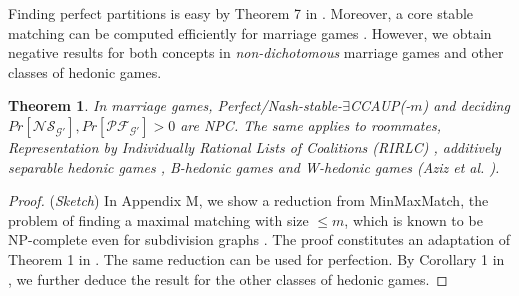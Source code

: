 \documentclass[letterpaper]{article} %
\newtheorem{theorem}{Theorem}
\begin{document}
Finding perfect partitions is easy by Theorem 7 in \cite{aziz2013pareto}. Moreover, a core stable matching can be computed efficiently for marriage games \cite{gale1962college}. However, we obtain negative results for both concepts in \textit{non-dichotomous} marriage games and other classes of hedonic games.
\begin{theorem}
\label{theorem:nash-stable-marriage}
In marriage games, Perfect/Nash-stable-$\exists$CCAUP(-$m$) and deciding $Pr[\mathcal{NS}_{\mathcal{G}'}], Pr[\mathcal{PF}_{\mathcal{G}'}] > 0$ are NPC. The same applies to {\normalfont roommates}, {\normalfont Representation by Individually Rational Lists of Coalitions (RIRLC)} \cite{ballester2004np}, {\normalfont additively separable hedonic games} \cite{olsen2009nash}, {\normalfont B-hedonic games} and {\normalfont W-hedonic games} (Aziz et al. ).
\end{theorem}
\begin{proof}
(\textit{Sketch}) In Appendix M, we show a reduction from MinMaxMatch, the problem of finding a maximal matching with size $\leq m$, which is known to be NP-complete even for subdivision graphs \cite{horton1993minimum}. The proof constitutes an adaptation of Theorem 1 in \cite{aziz2013stable}. The same reduction can be used for perfection. %
By Corollary 1 in \cite{aziz2013stable}, we further deduce the result for the other classes of hedonic games.
\end{proof}
\end{document}
